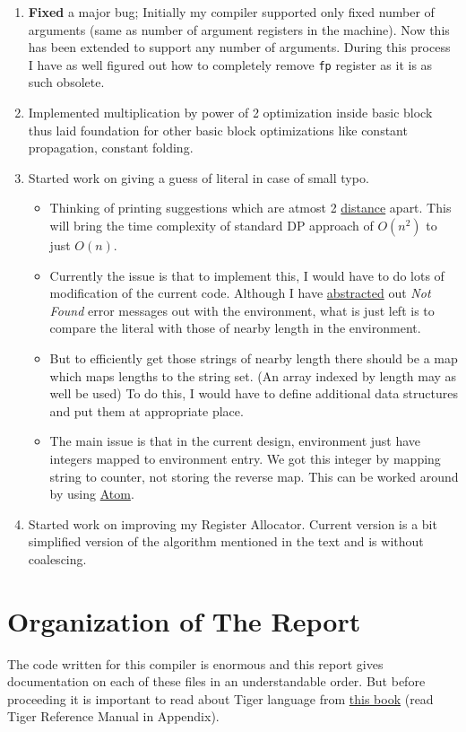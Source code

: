 \begin{enumerate}
  \item \textbf{Fixed} a major bug; Initially my compiler supported only fixed number of arguments (same as number of argument registers in the machine). Now this has been extended to support any number of arguments. During this process I have as well figured out how to completely remove \texttt{fp} register as it is as such obsolete.   
  \item Implemented multiplication by power of 2 optimization inside basic block thus laid foundation for other basic block optimizations like constant propagation, constant folding.
  \item Started work on giving a guess of literal in case of small typo. 
  \begin{itemize}
    \item Thinking of printing suggestions which are atmost 2 \href{https://en.wikipedia.org/wiki/Edit_distance}{distance} apart. This will bring the time complexity of standard DP approach of $O(n^2)$ to just $O(n)$. 
    \item Currently the issue is that to implement this, I would have to do lots of modification of the current code. Although I have \href{https://github.com/sourabh2311/btp/commit/8f27478a3c51b9e41bef68961a28c400d4ef29dd}{abstracted} out \textit{Not Found} error messages out with the environment, what is just left is to compare the literal with those of nearby length in the environment. 
    \item But to efficiently get those strings of nearby length there should be a map which maps lengths to the string set. (An array indexed by length may as well be used) To do this, I would have to define additional data structures and put them at appropriate place. 
    \item The main issue is that in the current design, environment just have integers mapped to environment entry. We got this integer by mapping string to counter, not storing the reverse map. This can be worked around by using \href{http://www.cs.utah.edu/~mjones/sml-nj-lib/atom.html}{Atom}.  
  \end{itemize}
  \item Started work on improving my Register Allocator. Current version is a bit simplified version of the algorithm mentioned in the text and is without coalescing.
\end{enumerate}

\section{Organization of The Report}

The code written for this compiler is enormous and this report gives documentation on each of these files in an understandable order. But before proceeding it is important to read about Tiger language from \href{https://www.cs.princeton.edu/~appel/modern/ml/}{this book} (read Tiger Reference Manual in Appendix). 


